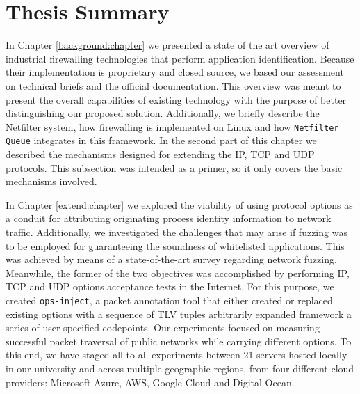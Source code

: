 \section{Thesis Summary}
\label{conclusion:summary}

In Chapter \ref{background:chapter} we presented a state of the art overview of
industrial firewalling technologies that perform application identification.
Because their implementation is proprietary and closed source, we based our
assessment on technical briefs and the official documentation. This overview was
meant to present the overall capabilities of existing technology with the
purpose of better distinguishing our proposed solution. Additionally, we
briefly describe the Netfilter system, how firewalling is implemented on Linux
and how \texttt{Netfilter Queue} integrates in this framework. In the second
part of this chapter we described the mechanisms designed for extending the IP,
TCP and UDP protocols. This subsection was intended as a primer, so it only
covers the basic mechanisms involved.

In Chapter \ref{extend:chapter} we explored the viability of using protocol
options as a conduit for attributing originating process identity information
to network traffic. Additionally, we investigated the challenges that may arise
if fuzzing was to be employed for guaranteeing the soundness of whitelisted
applications. This was achieved by means of a state-of-the-art survey regarding
network fuzzing. Meanwhile, the former of the two objectives was accomplished by
performing IP, TCP and UDP options acceptance tests in the Internet. For this
purpose, we created \texttt{ops-inject}, a packet annotation tool that either
created or replaced existing options with a sequence of TLV tuples arbitrarily expanded
framework a series of user-specified codepoints. Our experiments focused on measuring
successful packet traversal of public networks while carrying different options.
To this end, we have staged all-to-all experiments between 21 servers hosted
locally in our university and across multiple geographic regions, from four
different cloud providers: Microsoft Azure, AWS, Google Cloud and Digital Ocean.


